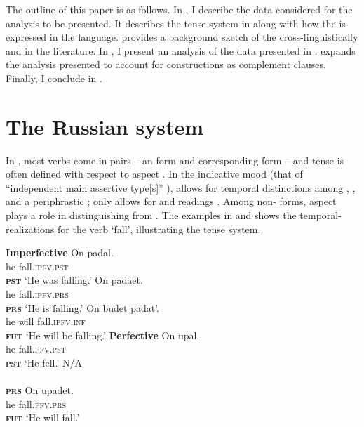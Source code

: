 \documentclass[output=paper,modfonts,newtxmath,hidelinks,]{langscibook}
\begin{document}
The outline of this paper is as follows. In , I describe the data considered for the analysis to be presented. It describes the tense system in  along with how the  is expressed in the language.  provides a background sketch of the  cross-linguistically and in the literature. In , I present an analysis of the data presented in .  expands the analysis presented to account for   constructions as complement clauses. Finally, I conclude in . 

\section{The Russian system}\label{10:s2}

In , most verbs come in  pairs \citep[371]{Mezhevich2008} – an  form and corresponding  form – and tense is often defined with respect to aspect \citep[373]{Mezhevich2008}. In the indicative mood (that of “independent main assertive  type[s]” \citep[1]{Wiltschko}),  allows for temporal distinctions among , , and a periphrastic ;  only allows for  and  readings \citep[371]{Mezhevich2008}. Among non- forms, aspect plays a role in distinguishing  from . The examples in  and  shows the temporal- realizations for the verb ‘fall’, illustrating the  tense system.

\begin{multicols}{2}
\ea \textbf{Imperfective}\label{10:ex:ipfv}
\ea\gll On padal.\\
he fall.\textsc{ipfv.pst}\\\hfill\textsc{\textbf{pst}}
\glt `He was falling.'
\ex\gll On padaet.\\
he fall.\textsc{ipfv.prs}\\\hfill\textsc{\textbf{prs}}
\glt `He is falling.'
\ex\gll On budet padat'.\\
he will fall.\textsc{ipfv.inf}\\\hfill\textsc{\textbf{fut}}
\glt `He will be falling.'
\z\z\columnbreak
\ea \textbf{Perfective}\label{10:ex:pfv}
\ea\gll On upal.\\
he fall.\textsc{pfv.pst}\\\hfill\textsc{\textbf{pst}}
\glt `He fell.'
\ex\gll N/A\\
{}\\\hfill\textsc{\textbf{prs}}
\glt {}\vspace{14pt}
\ex\gll On upadet.\\
he fall.\textsc{pfv.prs}\\\hfill\textsc{\textbf{fut}}
\glt `He will fall.'
\z\z

\end{multicols}
\end{document}
